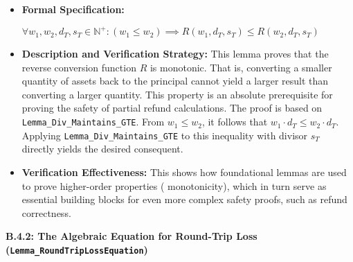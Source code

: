 \documentclass[
  english,
  onecolumn]{article}
\begin{document}
\begin{itemize}
\item
  \textbf{Formal Specification:}

  \(\forall w_1, w_2, d_T, s_T \in \mathbb{N}^+ : (w_1 \le w_2) \implies R(w_1, d_T, s_T) \le R(w_2, d_T, s_T)\)
\item
  \textbf{Description and Verification Strategy:} This lemma proves that
  the reverse conversion function \(R\) is monotonic. That is,
  converting a smaller quantity of assets back to the principal cannot
  yield a larger result than converting a larger quantity. This property
  is an absolute prerequisite for proving the safety of partial refund
  calculations. The proof is based on
  \texttt{Lemma\_Div\_Maintains\_GTE}. From \(w_1 \le w_2\), it follows
  that \(w_1 \cdot d_T \le w_2 \cdot d_T\). Applying
  \texttt{Lemma\_Div\_Maintains\_GTE} to this inequality with divisor
  \(s_T\) directly yields the desired consequent.
\item
  \textbf{Verification Effectiveness:} This shows how foundational
  lemmas are used to prove higher-order properties ( monotonicity),
  which in turn serve as essential building blocks for even more complex
  safety proofs, such as refund correctness.
\end{itemize}

\textbf{B.4.2: The Algebraic Equation for Round-Trip Loss
(\texttt{Lemma\_RoundTripLossEquation})}
\end{document}
